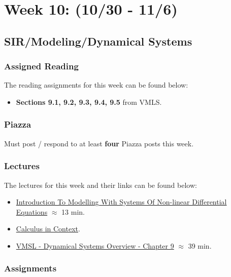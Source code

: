 \clearpage
\chapter{Week 10: (10/30 - 11/6)}

\section{SIR/Modeling/Dynamical Systems}

\subsection{Assigned Reading}

The reading assignments for this week can be found below:

\begin{itemize}
    \item \textbf{Sections 9.1, 9.2, 9.3, 9.4, 9.5} from VMLS.
\end{itemize}

\subsection{Piazza}

Must post / respond to at least \textbf{four} Piazza posts this week.  

\subsection{Lectures}

The lectures for this week and their links can be found below:

\begin{itemize}
    \item \href{https://applied.cs.colorado.edu/mod/hvp/view.php?id=50773}{Introduction To Modelling With Systems Of Non-linear Differential Equations} $\approx$ 13 min.
    \item \href{https://scholarworks.smith.edu/textbooks/2/}{Calculus in Context}.
    \item \href{https://www.youtube.com/watch?v=NS0jvPLtgGc}{VMSL - Dynamical Systems Overview - Chapter 9} $\approx$ 39 min.
\end{itemize}

\subsection{Assignments}

